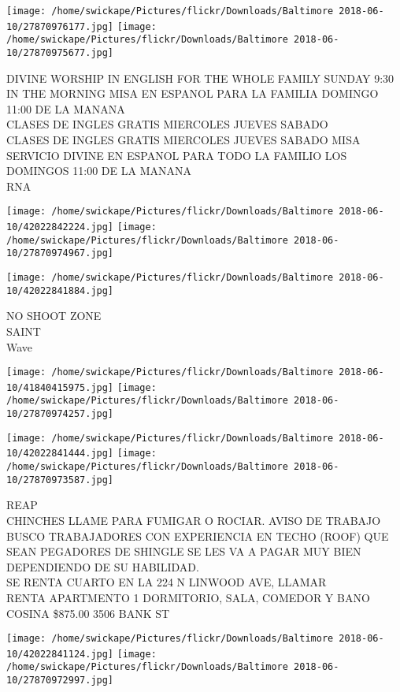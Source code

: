 \documentclass[10pt,letterpaper]{article}
\begin{document}
\texttt{[image: /home/swickape/Pictures/flickr/Downloads/Baltimore 2018-06-10/27870976177.jpg]}
\texttt{[image: /home/swickape/Pictures/flickr/Downloads/Baltimore 2018-06-10/27870975677.jpg]}

DIVINE WORSHIP IN ENGLISH FOR THE WHOLE FAMILY SUNDAY 9:30 IN THE MORNING MISA EN ESPANOL PARA LA FAMILIA DOMINGO 11:00 DE LA MANANA\\
CLASES DE INGLES GRATIS MIERCOLES JUEVES SABADO\\
CLASES DE INGLES GRATIS MIERCOLES JUEVES SABADO MISA SERVICIO DIVINE EN ESPANOL PARA TODO LA FAMILIO LOS DOMINGOS 11:00 DE LA MANANA\\
RNA
\pagebreak

\texttt{[image: /home/swickape/Pictures/flickr/Downloads/Baltimore 2018-06-10/42022842224.jpg]}
\texttt{[image: /home/swickape/Pictures/flickr/Downloads/Baltimore 2018-06-10/27870974967.jpg]}

\vspace{0.25in}
\texttt{[image: /home/swickape/Pictures/flickr/Downloads/Baltimore 2018-06-10/42022841884.jpg]}

NO SHOOT ZONE\\
SAINT\\
Wave
\pagebreak

\texttt{[image: /home/swickape/Pictures/flickr/Downloads/Baltimore 2018-06-10/41840415975.jpg]}
\texttt{[image: /home/swickape/Pictures/flickr/Downloads/Baltimore 2018-06-10/27870974257.jpg]}

\texttt{[image: /home/swickape/Pictures/flickr/Downloads/Baltimore 2018-06-10/42022841444.jpg]}
\texttt{[image: /home/swickape/Pictures/flickr/Downloads/Baltimore 2018-06-10/27870973587.jpg]}

REAP\\
CHINCHES LLAME PARA FUMIGAR O ROCIAR. AVISO DE TRABAJO BUSCO TRABAJADORES CON EXPERIENCIA EN TECHO (ROOF) QUE SEAN PEGADORES DE SHINGLE SE LES VA A PAGAR MUY BIEN DEPENDIENDO DE SU HABILIDAD.\\
SE RENTA CUARTO EN LA 224 N LINWOOD AVE, LLAMAR\\
RENTA APARTMENTO 1 DORMITORIO, SALA, COMEDOR Y BANO COSINA \$875.00 3506 BANK ST
\pagebreak

\texttt{[image: /home/swickape/Pictures/flickr/Downloads/Baltimore 2018-06-10/42022841124.jpg]}
\texttt{[image: /home/swickape/Pictures/flickr/Downloads/Baltimore 2018-06-10/27870972997.jpg]}
\end{document}
